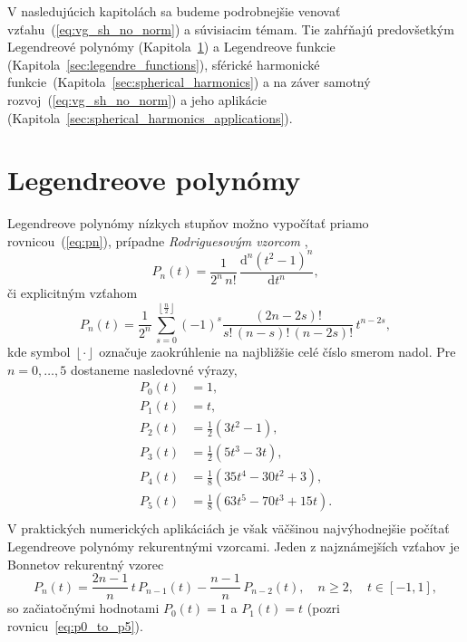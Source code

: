 \documentclass[a4paper, 12pt]{book}
\newcommand{\diff}{\mathrm d}
\begin{document}
V nasledujúcich kapitolách sa budeme podrobnejšie venovať 
vzťahu~(\ref{eq:vg_sh_no_norm}) a súvisiacim témam.  Tie zahŕňajú predovšetkým 
Legendreové polynómy (Kapitola~\ref{sec:legendre_polynomials}) a Legendreove 
funkcie (Kapitola~\ref{sec:legendre_functions}), sférické harmonické 
funkcie~(Kapitola~\ref{sec:spherical_harmonics}) a na záver samotný 
rozvoj~(\ref{eq:vg_sh_no_norm}) a jeho aplikácie 
(Kapitola~\ref{sec:spherical_harmonics_applications}).








\section{Legendreove polynómy}
\label{sec:legendre_polynomials}

Legendreove polynómy nízkych stupňov možno vypočítať priamo 
rovnicou~(\ref{eq:pn}), prípadne \emph{Rodriguesovým vzorcom} 
\citep{SansoGeoidDetermination},
%
\begin{equation}
\label{eq:pn_rodrigues}
P_n(t) = \frac{1}{2^n \, n!} \, \frac{\diff^n (t^2 - 1)^n}{\diff t^n}{,}
\end{equation}
%
či explicitným vzťahom \citep{Freeden2009}
%
\begin{equation}
P_n(t) = \frac{1}{2^n} \, \sum_{s = 0}^{\left\lfloor \frac{n}{2} \right\rfloor} 
(-1)^s \frac{(2n - 2s)!}{s!  \, (n - s)! \, (n - 2s)!} \, t^{n - 2s}{,}
\end{equation}
%
kde symbol $\left\lfloor \cdot \right\rfloor$ označuje zaokrúhlenie na 
najbližšie celé číslo smerom nadol.  Pre $n = 0, \dots, 5$ dostaneme nasledovné 
výrazy,
%
\begin{equation}
\label{eq:p0_to_p5}
\begin{split}
P_0(t) & = 1{,}\\
P_1(t) & = t{,}\\
P_2(t) & = \frac{1}{2} \left( 3t^2  - 1 \right){,}\\
P_3(t) & = \frac{1}{2} (5t^3 - 3t){,}\\
P_4(t) & = \frac{1}{8}(35t^4 - 30t^2 + 3){,}\\
P_5(t) & = \frac{1}{8}(63t^5 - 70t^3 + 15t){.}\\
\end{split}
\end{equation}
%
V praktických numerických aplikáciách je však väčšinou najvýhodnejšie počítať 
Legendreove polynómy rekurentnými vzorcami.  Jeden z najznámejších vzťahov je 
Bonnetov rekurentný vzorec
%
\begin{equation}
\label{eq:pn_bonnet}
P_n(t) = \frac{2n - 1}{n} \, t \, P_{n - 1}(t) - \frac{n - 1}{n} \, P_{n 
- 2}(t){,} \quad n \geq 2{,} \quad t \in [-1, 1]{,}
\end{equation}
%
so začiatočnými hodnotami $P_0(t) = 1$ a $P_1(t) = t$ (pozri 
rovnicu~\ref{eq:p0_to_p5}).
\end{document}
